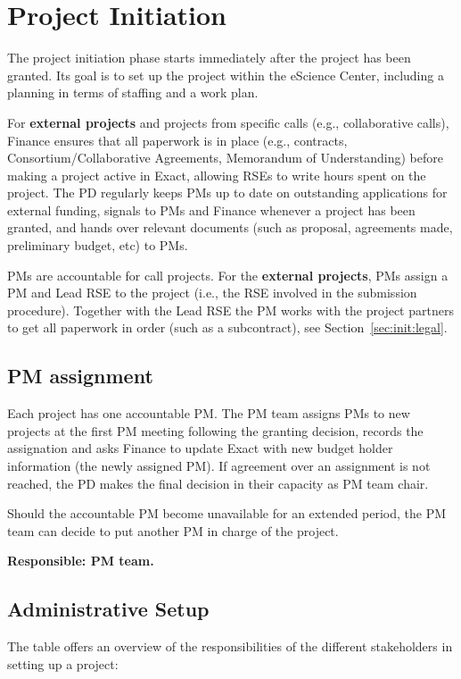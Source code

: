 \section{Project Initiation}
\label{sec:init}
The project initiation phase starts immediately after the project has been granted. Its goal is to set up the project
within the eScience Center, including a planning in terms of staffing and a work plan.

For \textbf{external projects} and projects from specific calls (e.g., collaborative calls), Finance ensures that all
paperwork is in place (e.g., contracts, Consortium/Collaborative Agreements, Memorandum of Understanding) before making
a project active in Exact, allowing RSEs to write hours spent on the project. The PD regularly keeps PMs up to date on
outstanding applications for external funding, signals to PMs and Finance whenever a project has been granted, and hands
over relevant documents (such as proposal, agreements made, preliminary budget, etc) to PMs. 

PMs are accountable for call projects. For the \textbf{external projects}, PMs assign a PM and Lead RSE to the project
(i.e., the RSE involved in the submission procedure). Together with the Lead RSE the PM works with the project partners
to get all paperwork in order (such as a subcontract), see Section~\ref{sec:init:legal}. 

\subsection{PM assignment}
\label{sec:init:pm-assign}
Each project has one accountable PM. The PM team assigns PMs to new projects at the first PM meeting following the
granting decision, records the assignation and asks Finance to update Exact with new budget holder information (the newly
assigned PM). If agreement over an assignment is not reached, the PD makes the final decision in their capacity as PM
team chair.

Should the accountable PM become unavailable for an extended period, the PM team can decide to put another PM in charge
of the project.

\textbf{Responsible: PM team.}

\subsection{Administrative Setup}
The table offers an overview of the responsibilities of the different stakeholders in setting up a project:

